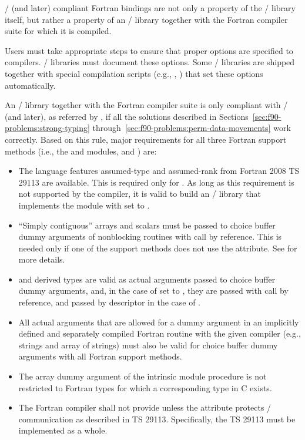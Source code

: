 \MPIIIIDOTO/ (and later) compliant Fortran bindings are not
only a property of the \MPI/ library itself, but rather
a property of an \MPI/ library together with the Fortran compiler suite
for which it is compiled.
\begin{users}
Users must take appropriate steps to ensure that proper options are specified
to compilers. \MPI/ libraries must document these options.
Some \MPI/ libraries are shipped together with special compilation scripts
(e.g., , ) that set these options automatically.
\end{users}
An \MPI/ library together with the Fortran compiler suite
is only compliant with \MPIIIIDOTO/ (and later), as referred
by , if all the solutions described in
Sections~\ref{sec:f90-problems:strong-typing} through~\ref{sec:f90-problems:perm-data-movements}
work correctly.
Based on this rule, major requirements for all three
Fortran support methods (i.e., the  and  modules, and ) are:
\begin{itemize}
\item
  The language features assumed-type and assumed-rank
  from Fortran 2008 TS 29113
  \cite{fortran2008:ts29113-interop} are available.
  This is required only for .
  As long as this requirement is not supported by the compiler,
  it is valid to build
  an \MPI/
  library that implements the  module with
   set to .
\item
  ``Simply contiguous'' arrays and scalars
  must be passed to choice buffer dummy arguments of nonblocking routines
  with call by reference.
  This is needed only if one of the support methods does not use
  the  attribute.
  See  for more details.
\item
   and  derived types
  are valid as actual arguments passed to choice buffer dummy arguments,
  and, in the case of  set to
  ,
  they are passed with call by reference,
  and passed by descriptor in the case of .
\item
  All actual arguments that are allowed for a dummy argument
  in an implicitly defined and separately compiled Fortran routine
  with the given compiler (e.g.,  strings
  and array of strings) must also be valid for choice buffer
  dummy arguments with all Fortran support methods.
\item
  The array dummy argument of the  intrinsic module procedure
   is not restricted to Fortran types for which
  a corresponding type in C exists.
\item
  The Fortran compiler shall not provide  unless the 
  attribute protects \MPI/ communication as described in
  TS 29113.
  Specifically, the TS 29113 must be implemented as a whole.
\end{itemize}
